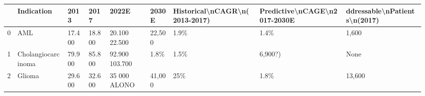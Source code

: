 \begin{tabular}{lllllllll}
\toprule
{} &          Indication &    2013 &    2017 &           2022E &   2030E & Historical\textbackslash nCAGR\textbackslash n(2013-2017) & Predictive\textbackslash nCAGE\textbackslash n2017-2030E & ddressable\textbackslash nPatients\textbackslash n(2017) \\
\midrule
0 &                 AML &  17.400 &  18.800 &   20.100 22.500 &  22,500 &                          1.9\% &                         1.4\% &                        1,600 \\
1 &  Cholangiocarcinoma &  79.900 &  85.800 &  92.900 103.700 &    1.8\% &                          1.5\% &                      6,900?) &                         None \\
2 &              Glioma &  29.600 &  32.600 &    35 000 ALONO &  41,000 &                           25\% &                         1.8\% &                       13,600 \\
\bottomrule
\end{tabular}
